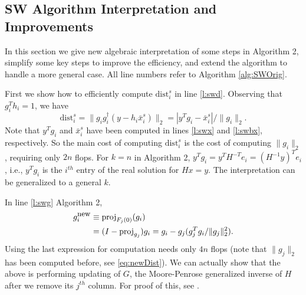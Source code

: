 \documentclass[12pt,Bold,letterpaper]{mcgilletdclass}
\newcommand{\dist}{\mathrm{dist}}
\begin{document}
\subsection{SW Algorithm Interpretation and Improvements}
\label{sec:improvedSW}
In this section we give new algebraic interpretation of some steps in Algorithm 2,
simplify some key steps to improve the efficiency,
and  extend the algorithm to handle a more general case.
All line numbers refer to Algorithm \ref{alg:SWOrig}.

First we show  how to efficiently compute $\dist_i^s$ in line \ref{l:swd}. 
Observing that $g_i^Th_i = 1$, we have
\begin{equation}
\label{eq:newDist}
\dist_i^s =   \|  g_ig_i^\dag (y-h_i\bar{x}_i^s)  \|_2 
=    | y^Tg_i -\bar{x}_i^s |/\| g_i  \|_2.
\end{equation} 
Note that $y^Tg_i$ and $\bar{x}_i^s$ have been computed in lines \ref{l:swx} and \ref{l:swbx}, respectively.
So the main cost of computing $\dist_i^s$ is the cost of computing $\|g_i\|_2$,
requiring only $2n$ flops. 
For $k=n$ in Algorithm 2,  $y^Tg_i=y^TH^{-T}e_i=(H^{-1}y)^Te_i$, i.e.,  $y^Tg_i$
is the $i^{th}$ entry of the real solution for $Hx=y$. 
The interpretation can be generalized to  a general $k$. 

In line \ref{l:swg} Algorithm 2,  
\begin{align}
g_i^{\small \mbox{new}} & \equiv \mbox{proj}_{F_j(0)}(g_i)   \nonumber \\
  & =(I- \mbox{proj}_{g_j})g_i=g_i- g_j(g_j^Tg_i/\|g_j\|_2^2). \label{eq:gup}
\end{align}
Using the last expression for computation needs only $4n$ flops
(note that $\|g_j\|_2$ has been computed before, see \eqref{eq:newDist}).
We can actually show that the above is performing updating of $G$, the Moore-Penrose generalized inverse of
$H$ after we remove its $j^{th}$ column. 
For proof of this, see \cite{Cli64}. 
\end{document}
